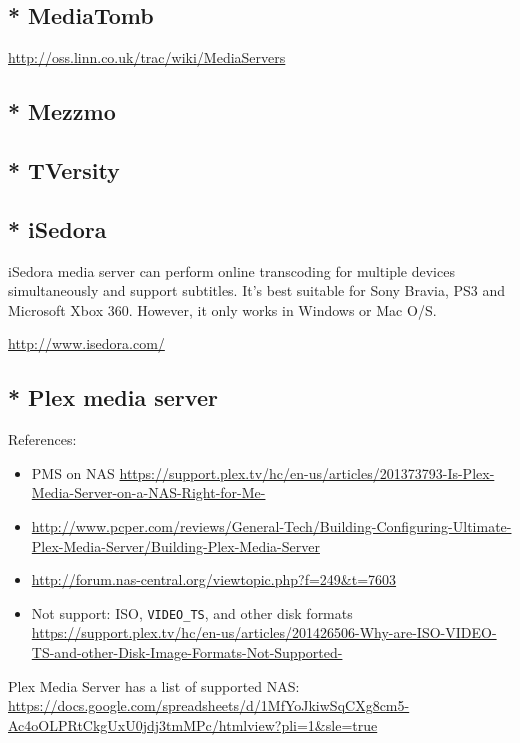 \subsection{* MediaTomb}

\url{http://oss.linn.co.uk/trac/wiki/MediaServers}


\subsection{* Mezzmo}

\subsection{* TVersity}

\subsection{* iSedora}

iSedora media server can perform online transcoding for multiple devices
simultaneously and support subtitles. It's best suitable for Sony Bravia, PS3
and Microsoft Xbox 360. However, it only works in Windows or Mac O/S.

\url{http://www.isedora.com/}

\subsection{* Plex media server}
\label{sec:Plex_mediaserver}

References:
\begin{itemize}
  \item PMS on NAS 
  \url{https://support.plex.tv/hc/en-us/articles/201373793-Is-Plex-Media-Server-on-a-NAS-Right-for-Me-}
  
  \item
  \url{http://www.pcper.com/reviews/General-Tech/Building-Configuring-Ultimate-Plex-Media-Server/Building-Plex-Media-Server}

  \item \url{http://forum.nas-central.org/viewtopic.php?f=249&t=7603}
   
  \item Not support: ISO, \verb!VIDEO_TS!, and other disk formats
  \url{https://support.plex.tv/hc/en-us/articles/201426506-Why-are-ISO-VIDEO-TS-and-other-Disk-Image-Formats-Not-Supported-}
\end{itemize}

Plex Media Server has a list of supported NAS:
\url{https://docs.google.com/spreadsheets/d/1MfYoJkiwSqCXg8cm5-Ac4oOLPRtCkgUxU0jdj3tmMPc/htmlview?pli=1&sle=true}

